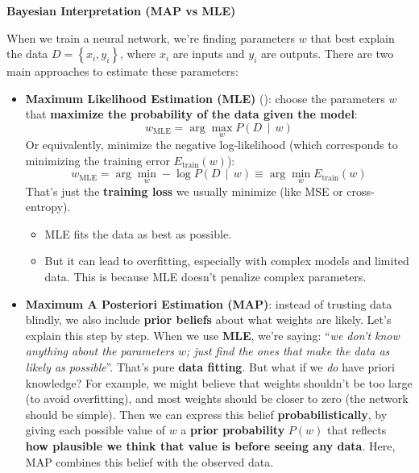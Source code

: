 \newpage

\begin{flushleft}
    \textcolor{Green3}{ \textbf{Bayesian Interpretation (MAP vs MLE)}}
\end{flushleft}
When we train a neural network, we're finding parameters $w$ that best explain the data $D = \left\{x_i, y_i\right\}$, where $x_i$ are inputs and $y_i$ are outputs. There are two main approaches to estimate these parameters:
\begin{itemize}
    \item \textbf{Maximum Likelihood Estimation (MLE)} (): choose the parameters $w$ that \textbf{maximize the probability of the data given the model}:
    \begin{equation*}
        w_{\text{MLE}} = \arg\max_{w} P\left(D \, \mid \, w\right)
    \end{equation*}
    Or equivalently, minimize the negative log-likelihood (which corresponds to minimizing the training error $E_{\text{train}}(w)$):
    \begin{equation*}
        w_{\text{MLE}} = \arg\min_{w} -\log P\left(D \, \mid \, w\right) \equiv \arg\min_{w} E_{\text{train}}(w)
    \end{equation*}
    That's just the \textbf{training loss} we usually minimize (like MSE or cross-entropy).
    \begin{itemize}
        \item[\textcolor{Green3}{\faIcon{check}}] MLE fits the data as best as possible.
        \item[\textcolor{Red2}{\faIcon{times}}] But it can lead to overfitting, especially with complex models and limited data. This is because MLE doesn't penalize complex parameters.
    \end{itemize}

    
    \item \textbf{Maximum A Posteriori Estimation (MAP)}: instead of trusting data blindly, we also include \textbf{prior beliefs} about what weights are likely. Let's explain this step by step. When we use \textbf{MLE}, we're saying: ``\emph{we don't know anything about the parameters $w$; just find the ones that make the data as likely as possible}''. That's pure \textbf{data fitting}. But what if we \emph{do} have priori knowledge? For example, we might believe that weights shouldn't be too large (to avoid overfitting), and most weights should be closer to zero (the network should be simple). Then we can express this belief \textbf{probabilistically}, by giving each possible value of $w$ a \textbf{prior probability} $P(w)$ that reflects \textbf{how plausible we think that value is before seeing any data}. Here, MAP combines this belief with the observed data.
    

\end{itemize}
